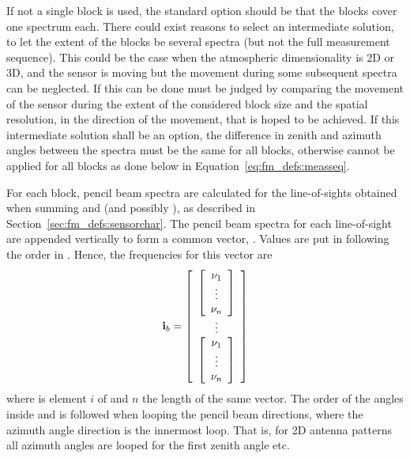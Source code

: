 If not a single block is used, the standard option should be that the
blocks cover one spectrum each. There could exist reasons to select an
intermediate solution, to let the extent of the blocks be several
spectra (but not the full measurement sequence). This could be the
case when the atmospheric dimensionality is 2D or 3D, and the sensor
is moving but the movement during some subsequent spectra can be
neglected. If this can be done must be judged by comparing the
movement of the sensor during the extent of the considered block
size and the spatial resolution, in the direction of the movement, that
is hoped to be achieved. If this intermediate solution shall be an
option, the difference in zenith and azimuth angles between the
spectra must be the same for all blocks, otherwise  cannot
be applied for all blocks as done below in Equation~\ref{eq:fm_defs:measseq}.

For each block, pencil beam spectra are calculated for the
line-of-sights obtained when summing  and
 (and possibly
), as described in
Section~\ref{sec:fm_defs:sensorchar}. The pencil beam spectra for each
line-of-sight are appended vertically to form a common vector,
. Values are put in following the order in
. Hence, the frequencies for this vector are
\begin{equation}
  \mathbf{i}_{b} = 
  \left[ \begin{array}{c} 
     \left[
          \begin{array}{c} \nu_{1}\\\vdots\\\nu_{n} \end{array} 
     \right] \\
     \vdots \\
     \left[
          \begin{array}{c} \nu_{1}\\\vdots\\\nu_{n} \end{array} 
     \right]
     \end{array} \right]
  \label{eq:fm_defs:freqs_of_ib}
\end{equation}
where  is element $i$ of  and $n$ the length of
the same vector. The order of the angles inside 
and  is followed when looping the pencil beam
directions, where the azimuth angle direction is the innermost loop.
That is, for 2D antenna patterns all azimuth angles are looped for the
first zenith angle etc. 

